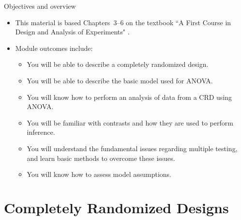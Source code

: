 \begin{frame}[allowframebreaks]{Objectives and overview}
  \begin{itemize}
    \item This material is based Chapters~3--6 on the textbook ``A First Course in Design and Analysis of Experiments" \citep{oehlert2000}.
    \item Module outcomes include: 
    \begin{itemize}
      \item You will be able to describe a completely randomized design.
      \item You will be able to describe the basic model used for ANOVA.
      \item You will know how to perform an analysis of data from a CRD using ANOVA.
      \item You will be familiar with contrasts and how they are used to perform inference.
      \item You will understand the fundamental issues regarding multiple testing, and learn basic methods to overcome these issues.
      \item You will know how to assess model assumptions.
    \end{itemize}
  \end{itemize}
\end{frame}

\section{Completely Randomized Designs}

